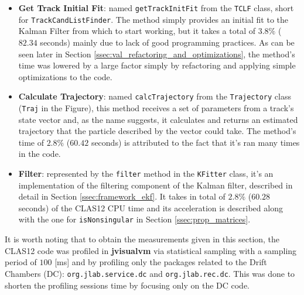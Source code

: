 \begin{itemize}
    \item \textbf{Get Track Initial Fit}: named \texttt{getTrackInitFit} from the \texttt{TCLF} class, short for \texttt{TrackCandListFinder}.
    The method simply provides an initial fit to the Kalman Filter from which to start working, but it takes a total of $3.8\%$ ($82.34$ seconds) mainly due to lack of good programming practices.
    As can be seen later in Section \ref{ssec:val_refactoring_and_optimizations}, the method's time was lowered by a large factor simply by refactoring and applying simple optimizations to the code.
    
    \item \textbf{Calculate Trajectory}: named \texttt{calcTrajectory} from the \texttt{Trajectory} class (\texttt{Traj} in the Figure), this method receives a set of parameters from a track's state vector and, as the name suggests, it calculates and returns an estimated trajectory that the particle described by the vector could take.
    The method's time of $2.8\%$ ($60.42$ seconds) is attributed to the fact that it's ran many times in the code.
    
    \item \textbf{Filter}: represented by the \texttt{filter} method in the \texttt{KFitter} class, it's an implementation of the filtering component of the Kalman filter, described in detail in Section \ref{ssec:framework_ekf}.
    It takes in total of $2.8\%$ ($60.28$ seconds) of the CLAS12 CPU time and its acceleration is described along with the one for \texttt{isNonsingular} in Section \ref{ssec:prop_matrices}.
\end{itemize}

It is worth noting that to obtain the measurements given in this section, the CLAS12 code was profiled in \textbf{jvisualvm} via statistical sampling with a sampling period of $100$ [ms] and by profiling only the packages related to the Drift Chambers (DC): \texttt{org.jlab.service.dc} and \texttt{org.jlab.rec.dc}.
This was done to shorten the profiling sessions time by focusing only on the DC code.